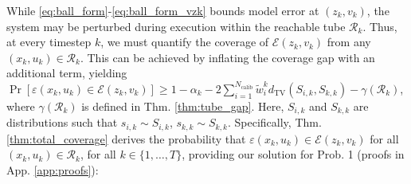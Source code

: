 \documentclass{l4dc2026}
\newcommand{\tvd}{d_\textrm{TV}}
\begin{document}
\noindent While \eqref{eq:ball_form}-\eqref{eq:ball_form_vzk} bounds model error at $(z_k, v_k)$, the system may be perturbed during execution within the reachable tube $\mathcal{R}_k$. Thus, at every timestep $k$, we must quantify the coverage of $\mathcal{E}(z_k, v_k)$ from any $(x_k,u_k) \in \mathcal{R}_k$. 
This can be achieved by inflating the coverage gap with an additional term, yielding $\Pr[\varepsilon(x_k,u_k) \in \mathcal{E}(z_k,v_k)] \ge 1-\alpha_k- 2\sum_{i=1}^{N_\textrm{calib}} \tilde{w}_i^k \tvd(S_{i,k}, S_{k,k}) - \gamma(\mathcal{R}_k)$, where $\gamma(\mathcal{R}_k)$ is defined in Thm. \ref{thm:tube_gap}. Here, $S_{i,k}$ and ${S}_{k,k}$ are distributions such that $s_{i,k} \sim S_{i,k}$, $s_{k,k} \sim {S}_{k,k}$. 
Specifically, Thm. \ref{thm:total_coverage} derives the probability that $\varepsilon(x_k,u_k)\in\mathcal{E}(z_k,v_k)$ for all $(x_k,u_k) \in \mathcal{R}_k$, for all $k \in \{1,\ldots,T\}$, providing our solution for Prob. 1 (proofs in App. \ref{app:proofs}):
\end{document}
